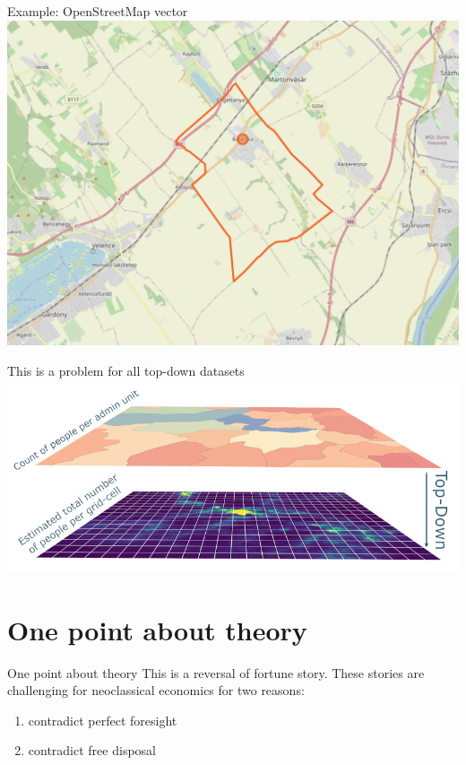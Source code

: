 \documentclass[
  ignorenonframetext,
  aspectratio=16,
]{beamer}
\providecommand{\tightlist}{%
  \setlength{\itemsep}{0pt}\setlength{\parskip}{0pt}}
\begin{document}
\begin{frame}{Example: OpenStreetMap vector}
\protect\hypertarget{example-openstreetmap-vector}{}
\includegraphics{vector.png}
\end{frame}

\begin{frame}{This is a problem for all top-down datasets}
\protect\hypertarget{this-is-a-problem-for-all-top-down-datasets}{}
\includegraphics{topdown.jpg}
\end{frame}

\hypertarget{one-point-about-theory}{%
\section{One point about theory}\label{one-point-about-theory}}

\begin{frame}{One point about theory}
\protect\hypertarget{one-point-about-theory-1}{}
This is a reversal of fortune story. These stories are challenging for
neoclassical economics for two reasons:

\begin{enumerate}
\tightlist
\item
  contradict perfect foresight
\item
  contradict free disposal
\end{enumerate}
\end{frame}
\end{document}
